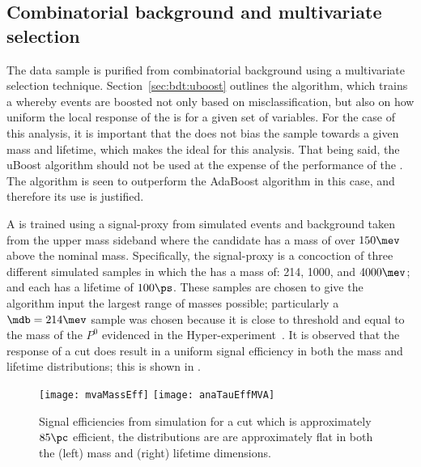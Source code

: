 


\subsection{Combinatorial background and multivariate selection}
The data sample is purified from combinatorial background using a multivariate selection technique.
Section~\ref{sec:bdt:uboost} outlines the \uBDT algorithm, which trains a \BDT whereby events are
boosted not only based on misclassification, but also on how uniform the local response of the \BDT
is for a given set of variables.
For the case of this analysis, it is important that the \BDT does not bias the sample towards a
given mass and
lifetime, which makes the \uBDT ideal for this analysis.
That being said, the uBoost algorithm should not be used at the expense of the performance of the
\BDT.
The \uBDT algorithm is seen to outperform the AdaBoost algorithm in this case,
and therefore its use is justified.

A \uBDT is trained using a signal-proxy from simulated events and background taken from the upper
\Bd mass sideband where the \Bd candidate has a mass of over $150\mev$ above the nominal \Bd mass.
Specifically, the signal-proxy is a concoction of three different simulated samples in which the
\db has a mass of: 214, 1000, and $4000\mev$; and each has a lifetime of $100\ps$.
These samples are chosen to give the \uBDT algorithm input the largest range of masses possible;
particularly a $\mdb=214\mev$ sample was chosen because it is close to threshold and equal to the
mass of the $P^0$ evidenced in the Hyper-\CP experiment~\cite{Park:2005eka}.
It is observed that the response of a \uBDT cut does result in a uniform signal efficiency in both
the mass and lifetime distributions; this is shown in .

\begin{figure}
  \begin{center}
    \texttt{[image: mvaMassEff]}
    \texttt{[image: anaTauEffMVA]}
    \caption[Signal efficiency of a uBDT cut as a function of mass and lifetime]
    {
      Signal efficiencies from simulation for a \uBDT cut which is approximately $85\pc$ efficient,
      the distributions are are approximately flat in both the (left) mass and (right) lifetime
      dimensions.
    }
    \label{fig:db:bdtflat}
  \end{center}
\end{figure}

